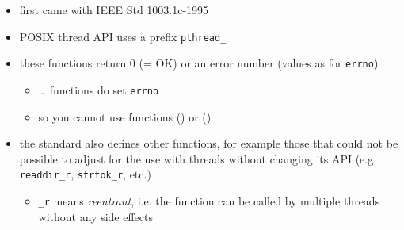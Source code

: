 \begin{slide}

\begin{itemize}
\item first came with IEEE Std 1003.1c-1995
\item POSIX thread API uses a prefix \texttt{pthread\_}
\item these functions return 0 (= OK) or an error number (values as for
\texttt{errno})
\begin{itemize}
\item \dots{} functions do  set \texttt{errno}
\item so you cannot use functions () or ()
\end{itemize}
\item the standard also defines other functions, for example those that could
not be possible to adjust for the use with threads without changing its API (e.g.
\texttt{readdir\_r}, \texttt{strtok\_r}, etc.)
\begin{itemize}
\item \texttt{\_r} means \emph{reentrant}, i.e. the function can be called by
multiple threads without any side effects
\end{itemize}
\end{itemize}

\end{slide}



